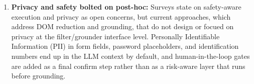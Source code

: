 \begin{enumerate}
    \item \textbf{Privacy and safety bolted on post-hoc:} Surveys \cite{tang2025surveymllmbasedguiagents} \cite{ning2025surveywebagentsnextgenerationai} state on safety-aware execution and privacy as open concerns, but current approaches, which address DOM reduction and grounding, that do not design or focued on  privacy at the filter/grounder interface level. Personally Identifiable Information (PII) in form fields, password placeholders, and identification numbers end up in the LLM context by default, and human-in-the-loop gates are added as a final confirm step rather than as a risk-aware layer that runs before grounding.
    
\end{enumerate}
